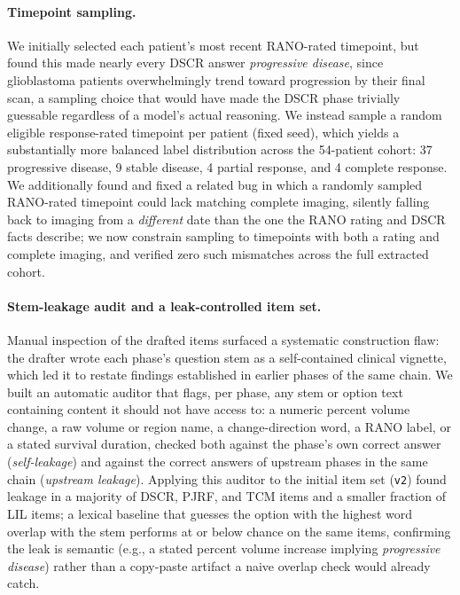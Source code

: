 \documentclass[11pt]{article}
\begin{document}
\paragraph{Timepoint sampling.} We initially selected each patient's most recent RANO-rated timepoint, but found this made nearly every DSCR answer \emph{progressive disease}, since glioblastoma patients overwhelmingly trend toward progression by their final scan, a sampling choice that would have made the DSCR phase trivially guessable regardless of a model's actual reasoning. We instead sample a random eligible response-rated timepoint per patient (fixed seed), which yields a substantially more balanced label distribution across the 54-patient cohort: 37 progressive disease, 9 stable disease, 4 partial response, and 4 complete response. We additionally found and fixed a related bug in which a randomly sampled RANO-rated timepoint could lack matching complete imaging, silently falling back to imaging from a \emph{different} date than the one the RANO rating and DSCR facts describe; we now constrain sampling to timepoints with both a rating and complete imaging, and verified zero such mismatches across the full extracted cohort.


\paragraph{Stem-leakage audit and a leak-controlled item set.} Manual inspection of the drafted items surfaced a systematic construction flaw: the drafter wrote each phase's question stem as a self-contained clinical vignette, which led it to restate findings established in earlier phases of the same chain. We built an automatic auditor that flags, per phase, any stem or option text containing content it should not have access to: a numeric percent volume change, a raw volume or region name, a change-direction word, a RANO label, or a stated survival duration, checked both against the phase's own correct answer (\emph{self-leakage}) and against the correct answers of upstream phases in the same chain (\emph{upstream leakage}). Applying this auditor to the initial item set (\texttt{v2}) found leakage in a majority of DSCR, PJRF, and TCM items and a smaller fraction of LIL items; a lexical baseline that guesses the option with the highest word overlap with the stem performs at or below chance on the same items, confirming the leak is semantic (e.g., a stated percent volume increase implying \emph{progressive disease}) rather than a copy-paste artifact a naive overlap check would already catch.
\end{document}
